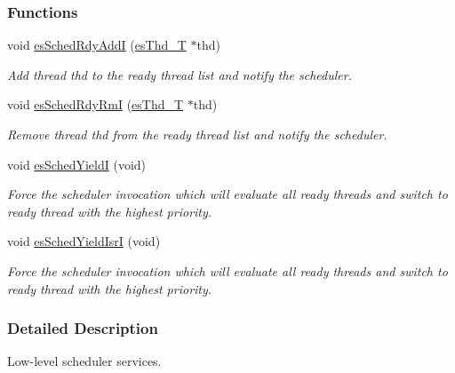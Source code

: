 \subsubsection*{Functions}
\begin{DoxyCompactItemize}
\item 
void \hyperlink{group__kern__sched_ga73e14b1860ce824c822adc407aee0977}{es\-Sched\-Rdy\-Add\-I} (\hyperlink{group__kern__thd_ga62e3a3ca0a4597a19c43cb8868810d82}{es\-Thd\-\_\-\-T} $\ast$thd)
\begin{DoxyCompactList}\small\item\em Add thread {\ttfamily thd} to the ready thread list and notify the scheduler. \end{DoxyCompactList}\item 
void \hyperlink{group__kern__sched_ga0b8263c5024ebb59cd9b95cc9253b44d}{es\-Sched\-Rdy\-Rm\-I} (\hyperlink{group__kern__thd_ga62e3a3ca0a4597a19c43cb8868810d82}{es\-Thd\-\_\-\-T} $\ast$thd)
\begin{DoxyCompactList}\small\item\em Remove thread {\ttfamily thd} from the ready thread list and notify the scheduler. \end{DoxyCompactList}\item 
void \hyperlink{group__kern__sched_gaf90e487bfce974dafaeed5009e189810}{es\-Sched\-Yield\-I} (void)
\begin{DoxyCompactList}\small\item\em Force the scheduler invocation which will evaluate all ready threads and switch to ready thread with the highest priority. \end{DoxyCompactList}\item 
void \hyperlink{group__kern__sched_gafbea29b376b29f11bbfc48a0f5144e9a}{es\-Sched\-Yield\-Isr\-I} (void)
\begin{DoxyCompactList}\small\item\em Force the scheduler invocation which will evaluate all ready threads and switch to ready thread with the highest priority. \end{DoxyCompactList}\end{DoxyCompactItemize}


\subsubsection{Detailed Description}
Low-\/level scheduler services. 

